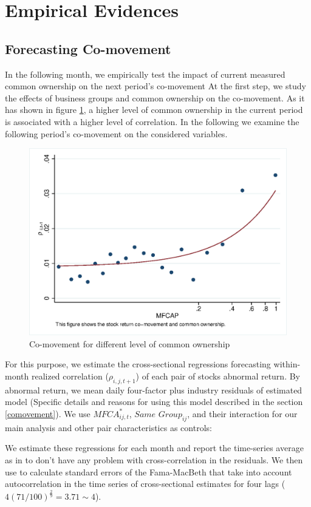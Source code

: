 
\section{Empirical Evidences}



\subsection{{Forecasting Co-movement}}
\label{Forecasting Co-movement}

	In the following month, we empirically test the impact of current measured
	common ownership on the next period’s co-movement
	At the first step, we study the effects of business groups and common ownership on the co-movement. As it has shown in figure \ref{mcorr50}, a higher level of common	ownership in the current period is associated with a higher level of correlation. In the following we examine the following period's co-movement on the considered variables.
	\begin{figure}[htbp]
	\centering  
	\centering
	\includegraphics[width=0.7\linewidth]{"Output/mcorr50.eps"} 
	\caption{Co-movement for different level of common ownership }
	\label{mcorr50}
\end{figure}
	
	For this purpose, we estimate the cross-sectional regressions forecasting within-month realized correlation ($\rho_{i,j,t+1}$) of each pair of stocks abnormal return. By abnormal return, we mean daily four-factor plus industry residuals of estimated model (Specific details and reasons for using this model described in the section \ref{comovement}). We use $\textit{MFCA}^*_{ij,t}$, $\textit{Same Group}_{ij} $, and their interaction for our main analysis and other pair characteristics as controls:
		

	
	We estimate these regressions for each month and report the time-series average as in \cite{FamaMacBeth} to don't have any problem with cross-correlation in the residuals. We then use  \cite{newey1987hypothesis} to calculate standard errors of the Fama-MacBeth that take into account autocorrelation in the time series of cross-sectional estimates for four lags ($ 4(71/100)^{\frac{2}{9}} = 3.71 \sim 4 $).
	
